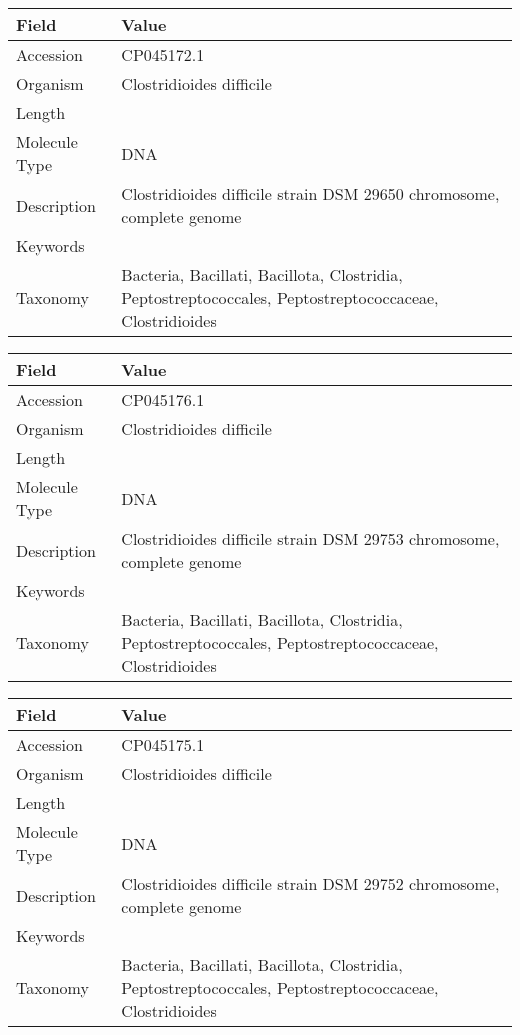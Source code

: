 \documentclass[10pt]{article}
\begin{document}
{\footnotesize
\begin{longtable}{>{\raggedright\arraybackslash}p{4.5cm} >{\raggedright\arraybackslash}p{11.5cm}}
\textbf{Field} & \textbf{Value} \\
\hline
Accession & CP045172.1 \\
Organism & Clostridioides difficile \\
Length & 3931260 \\
Molecule Type & DNA \\
Description & Clostridioides difficile strain DSM 29650 chromosome, complete genome \\
Keywords &  \\
Taxonomy & Bacteria, Bacillati, Bacillota, Clostridia, Peptostreptococcales, Peptostreptococcaceae, Clostridioides \\
\end{longtable}
}

{\footnotesize
\begin{longtable}{>{\raggedright\arraybackslash}p{4.5cm} >{\raggedright\arraybackslash}p{11.5cm}}
\textbf{Field} & \textbf{Value} \\
\hline
Accession & CP045176.1 \\
Organism & Clostridioides difficile \\
Length & 4071599 \\
Molecule Type & DNA \\
Description & Clostridioides difficile strain DSM 29753 chromosome, complete genome \\
Keywords &  \\
Taxonomy & Bacteria, Bacillati, Bacillota, Clostridia, Peptostreptococcales, Peptostreptococcaceae, Clostridioides \\
\end{longtable}
}

{\footnotesize
\begin{longtable}{>{\raggedright\arraybackslash}p{4.5cm} >{\raggedright\arraybackslash}p{11.5cm}}
\textbf{Field} & \textbf{Value} \\
\hline
Accession & CP045175.1 \\
Organism & Clostridioides difficile \\
Length & 4071592 \\
Molecule Type & DNA \\
Description & Clostridioides difficile strain DSM 29752 chromosome, complete genome \\
Keywords &  \\
Taxonomy & Bacteria, Bacillati, Bacillota, Clostridia, Peptostreptococcales, Peptostreptococcaceae, Clostridioides \\
\end{longtable}
}
\end{document}

